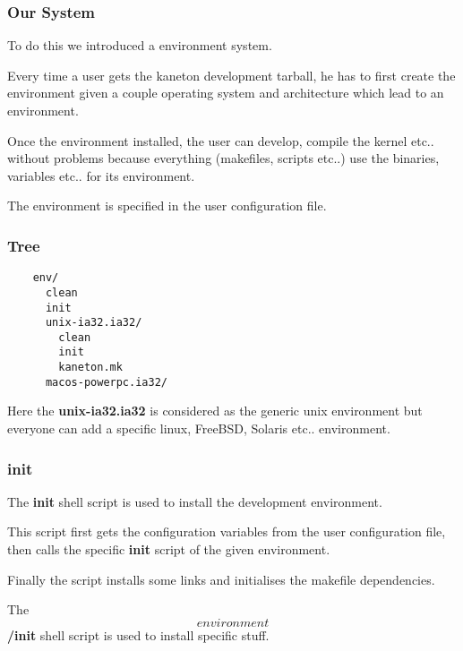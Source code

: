 \documentclass[8pt]{beamer}
\newcommand{\nl}[0]{\vspace{0.4cm}}
\begin{document}

\begin{frame}
  \frametitle{Our System}

  To do this we introduced a environment system.

  \nl

  Every time a user gets the kaneton development tarball, he has to first
  create the environment given a couple operating system and architecture
  which lead to an environment.

  \nl

  Once the environment installed, the user can develop, compile the kernel
  etc.. without problems because everything (makefiles, scripts etc..) use
  the binaries, variables etc.. for its environment.

  \nl

  The environment is specified in the user configuration file.
\end{frame}


\begin{frame}[containsverbastim]
  \frametitle{Tree}

  \begin{verbatim}
    env/
      clean
      init
      unix-ia32.ia32/
        clean
        init
        kaneton.mk
      macos-powerpc.ia32/
  \end{verbatim}

  \nl

  Here the \textbf{unix-ia32.ia32} is considered as the generic unix
  environment but everyone can add a specific linux, FreeBSD, Solaris etc..
  environment.
\end{frame}


\begin{frame}
  \frametitle{init}

  The \textbf{init} shell script is used to install the development
  environment.

  \nl

  This script first gets the configuration variables from the user
  configuration file, then calls the specific \textbf{init} script
  of the given environment.

  \nl

  Finally the script installs some links and initialises the makefile
  dependencies.

  \nl

  The \textbf{\[environment\]/init} shell script is used to install
  specific stuff.
\end{frame}
\end{document}
